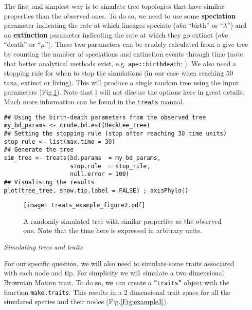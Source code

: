 \documentclass[12pt,letterpaper]{article}
\renewcommand{\subsection}[1]{%
\bigskip
\begin{center}
\begin{large}
\normalfont\itshape #1
\end{large}
\end{center}}
\newcommand{\treats}{\texttt{treats} }
\begin{document}
The first and simplest way is to simulate tree topologies that have similar properties than the observed ones.
To do so, we need to use some \textbf{speciation} parameter indicating the rate at which lineages speciate (\textit{aka} ``birth'' or ``$\lambda$'') and an \textbf{extinction} parameter indicating the rate at which they go extinct (\textit{aka} ``death'' or ``$\mu$'').
These two parameters can be crudely calculated from a give tree by counting the number of speciations and extinction events through time (note that better analytical methods exist, e.g. \texttt{ape::birthdeath}; \citealt{lawton1995extinction,ape}).
We also need a stopping rule for when to stop the simulations (in our case when reaching 50 taxa, extinct or living).
This will produce a single random tree using the input parameters (Fig.\ref{Fig:example2}).
Note that I will not discuss the options here in great details.
Much more information can be found in the \href{http://tguillerme.github.io/treats.htm}{\treats manual}.

\begin{lstlisting}
## Using the birth-death parameters from the observed tree
my_bd_params <- crude.bd.est(BeckLee_tree)
## Setting the stopping rule (stop after reaching 30 time units)
stop_rule <- list(max.time = 30)
## Generate the tree
sim_tree <- treats(bd.params  = my_bd_params,
                   stop.rule  = stop_rule,
                   null.error = 100)
## Visualising the results
plot(tree_tree, show.tip.label = FALSE) ; axisPhylo()
\end{lstlisting}

\begin{figure}[!htbp]
\centering
   \texttt{[image: treats\_example\_figure2.pdf]} 
\caption{A randomly simulated tree with similar properties as the observed one. Note that the time here is expressed in arbitrary units.}
\label{Fig:example2}
\end{figure}

\subsection{Simulating trees and traits}

For our specific question, we will also need to simulate some traits associated with each node and tip.
For simplicity we will simulate a two dimensional Brownian Motion trait.
To do so, we can create a \texttt{``traits''} object with the function \texttt{make.traits}.
This results in a 2 dimensional trait space for all the simulated species and their nodes (Fig.\ref{Fig:example3}).
\end{document}
